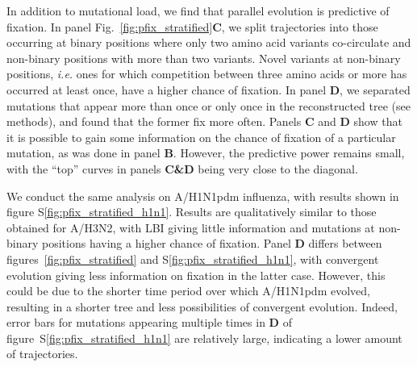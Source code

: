 \documentclass[reprint,amsmath,amssymb,superscriptaddress,showpacs,rmp]{revtex4-1}
\newcommand{\sref}[1]{S\ref{#1}}
\begin{document}
In addition to mutational load, we find that parallel evolution is predictive of fixation.
In panel Fig.~\ref{fig:pfix_stratified}\textbf{C}, we split trajectories into those occurring at binary positions where only two amino acid variants co-circulate and non-binary positions with more than two variants.
Novel variants at non-binary positions, \emph{i.e.} ones for which competition between three amino acids or more has occurred at least once, have a higher chance of fixation.
In panel \textbf{D}, we separated mutations that appear more than once or only once in the reconstructed tree (see methods), and found that the former fix more often.
Panels \textbf{C} and \textbf{D} show that it is possible to gain some information on the chance of fixation of a particular mutation, as was done in panel \textbf{B}.
However, the predictive power remains small, with the ``top'' curves in panels \textbf{C\&D} being very close to the diagonal.

We conduct the same analysis on A/H1N1pdm influenza, with results shown in figure \sref{fig:pfix_stratified_h1n1}.
Results are qualitatively similar to those obtained for A/H3N2, with LBI giving little information and mutations at non-binary positions having a higher chance of fixation.
Panel \textbf{D} differs between figures~\ref{fig:pfix_stratified} and \sref{fig:pfix_stratified_h1n1}, with convergent evolution giving less information on fixation in the latter case.
However, this could be due to the shorter time period over which A/H1N1pdm evolved, resulting in a shorter tree and less possibilities of convergent evolution.
Indeed, error bars for mutations appearing multiple times in \textbf{D} of figure~\sref{fig:pfix_stratified_h1n1} are relatively large, indicating a lower amount of trajectories.\\
\end{document}
